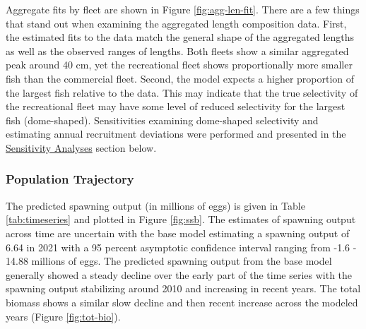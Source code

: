 \documentclass[11pt,
  english,
  a4paper,
]{article}
\begin{document}
\leavevmode\tagmcend\tagstructend\par


Aggregate fits by fleet are shown in Figure \ref{fig:agg-len-fit}. There are a few things that stand out when examining the aggregated length composition data. First, the estimated fits to the data match the general shape of the aggregated lengths as well as the observed ranges of lengths. Both fleets show a similar aggregated peak around 40 cm, yet the recreational fleet shows proportionally more smaller fish than the commercial fleet. Second, the model expects a higher proportion of the largest fish relative to the data. This may indicate that the true selectivity of the recreational fleet may have some level of reduced selectivity for the largest fish (dome-shaped). Sensitivities examining dome-shaped selectivity and estimating annual recruitment deviations were performed and presented in the {\protect\hyperlink{sensitivity-analyses}{Sensitivity Analyses}\leavevmode\tagmcend\tagstructend} section below.

\leavevmode\tagmcend\tagstructend\par


\hypertarget{population-trajectory}{%
\subsubsection{Population Trajectory}\label{population-trajectory}}

\leavevmode\tagmcend\tagstructend


The predicted spawning output (in millions of eggs) is given in Table \ref{tab:timeseries} and plotted in Figure \ref{fig:ssb}. The estimates of spawning output across time are uncertain with the base model estimating a spawning output of 6.64 in 2021 with a 95 percent asymptotic confidence interval ranging from -1.6 - 14.88 millions of eggs. The predicted spawning output from the base model generally showed a steady decline over the early part of the time series with the spawning output stabilizing around 2010 and increasing in recent years. The total biomass shows a similar slow decline and then recent increase across the modeled years (Figure \ref{fig:tot-bio}).

\leavevmode\tagmcend\tagstructend\par
\end{document}
